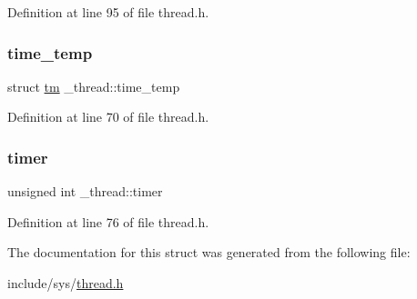 Definition at line 95 of file thread.\+h.

\mbox{\label{struct__thread_ae8c07f7023ee453f62dc51b2a9c1b50d}} 
\subsubsection{\texorpdfstring{time\_temp}{time\_temp}}
{\footnotesize\ttfamily struct \mbox{\hyperlink{structtm}{tm}} \+\_\+thread\+::time\+\_\+temp}



Definition at line 70 of file thread.\+h.

\mbox{\label{struct__thread_aa2d46b239912575b51c5d254fc588717}} 
\subsubsection{\texorpdfstring{timer}{timer}}
{\footnotesize\ttfamily unsigned int \+\_\+thread\+::timer}



Definition at line 76 of file thread.\+h.



The documentation for this struct was generated from the following file\+:\begin{DoxyCompactItemize}
\item 
include/sys/\mbox{\hyperlink{thread_8h}{thread.\+h}}\end{DoxyCompactItemize}

